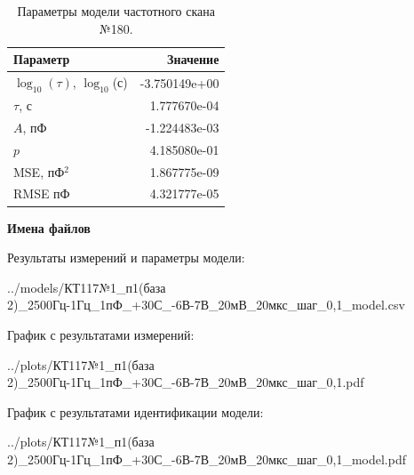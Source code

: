 \begin{table}[!ht]
    \centering
    \caption{Параметры модели частотного скана №180.}
    \begin{tabular}{|l|r|}
        \hline
        Параметр                                       & Значение                  \\ \hline
        $\log_{10}(\tau)$, $\log_{10}$(с)              & -3.750149e+00             \\ \hline
        $\tau$, с                                      & 1.777670e-04              \\ \hline
        $A$, пФ                                        & -1.224483e-03             \\ \hline
        $p$                                            & 4.185080e-01              \\ \hline
        MSE, пФ$^2$                                    & 1.867775e-09              \\ \hline
        RMSE пФ                                        & 4.321777e-05              \\ \hline
    \end{tabular}
    \label{table:frequency_scan_model_180}
\end{table}

\textbf{Имена файлов}

Результаты измерений и параметры модели:

\scriptsize../models/КТ117№1\_п1(база 2)\_2500Гц-1Гц\_1пФ\_+30С\_-6В-7В\_20мВ\_20мкс\_шаг\_0,1\_model.csv
\normalsize

График с результатами измерений:

\scriptsize../plots/КТ117№1\_п1(база 2)\_2500Гц-1Гц\_1пФ\_+30С\_-6В-7В\_20мВ\_20мкс\_шаг\_0,1.pdf
\normalsize

График с результатами идентификации модели:

\scriptsize../plots/КТ117№1\_п1(база 2)\_2500Гц-1Гц\_1пФ\_+30С\_-6В-7В\_20мВ\_20мкс\_шаг\_0,1\_model.pdf
\normalsize

